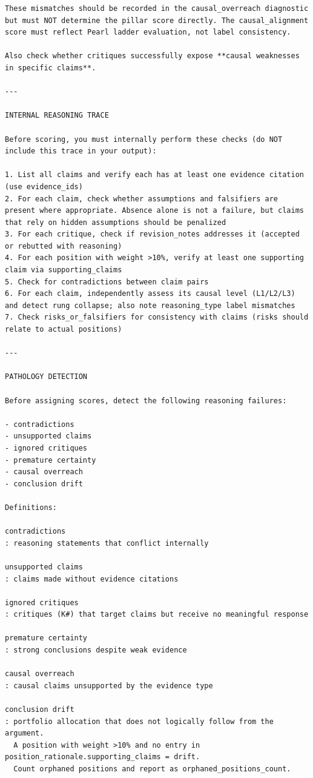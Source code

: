 \documentclass{article}
\begin{document}
\begin{lstlisting}[backgroundcolor=\color{promptbg}]
These mismatches should be recorded in the causal_overreach diagnostic but must NOT determine the pillar score directly. The causal_alignment score must reflect Pearl ladder evaluation, not label consistency.

Also check whether critiques successfully expose **causal weaknesses in specific claims**.

---

INTERNAL REASONING TRACE

Before scoring, you must internally perform these checks (do NOT include this trace in your output):

1. List all claims and verify each has at least one evidence citation (use evidence_ids)
2. For each claim, check whether assumptions and falsifiers are present where appropriate. Absence alone is not a failure, but claims that rely on hidden assumptions should be penalized
3. For each critique, check if revision_notes addresses it (accepted or rebutted with reasoning)
4. For each position with weight >10%, verify at least one supporting claim via supporting_claims
5. Check for contradictions between claim pairs
6. For each claim, independently assess its causal level (L1/L2/L3) and detect rung collapse; also note reasoning_type label mismatches
7. Check risks_or_falsifiers for consistency with claims (risks should relate to actual positions)

---

PATHOLOGY DETECTION

Before assigning scores, detect the following reasoning failures:

- contradictions
- unsupported claims
- ignored critiques
- premature certainty
- causal overreach
- conclusion drift

Definitions:

contradictions
: reasoning statements that conflict internally

unsupported claims
: claims made without evidence citations

ignored critiques
: critiques (K#) that target claims but receive no meaningful response

premature certainty
: strong conclusions despite weak evidence

causal overreach
: causal claims unsupported by the evidence type

conclusion drift
: portfolio allocation that does not logically follow from the argument.
  A position with weight >10% and no entry in position_rationale.supporting_claims = drift.
  Count orphaned positions and report as orphaned_positions_count.


\end{lstlisting}
\end{document}
